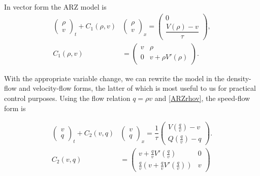 \documentclass[a4paper, 10pt, conference]{ieeeconf}      %
\begin{document}
In vector form the ARZ model is
\begin{subequations} \label{ARZrhov}
\begin{align}
\begin{pmatrix}
	\rho \\
	v
\end{pmatrix}_t
+ 
C_1 \left(\rho, v \right)
&
\begin{pmatrix}
	\rho \\ 
	v
\end{pmatrix}_x = 
\begin{pmatrix}
	0 \\ 
	\dfrac{V(\rho) - v}{\tau}
\end{pmatrix},\\
C_1 \left( \rho, v \right) 
&=
\begin{pmatrix}
	v & \rho \\
	0 & v + \rho V' (\rho)
\end{pmatrix}.
\end{align}
\end{subequations}

With the appropriate variable change, we can rewrite the model in the density-flow and velocity-flow forms, the latter of which is most useful to us for practical control purposes. Using the flow relation $q = \rho v$ and \eqref{ARZrhov}, the speed-flow form is

\begin{subequations}
\begin{align}
\begin{pmatrix}
	v \\ 
	q
\end{pmatrix}_t
+ C_2\left(v, q\right)&
\begin{pmatrix}
	v \\ 
	q
\end{pmatrix}_x 
=
\dfrac{1}{\tau}
\begin{pmatrix}
	V\left( \frac{q}{v}\right) - v \\
	Q\left( \frac{q}{v}\right) - q
\end{pmatrix}. \label{ARZvq} \\
C_2 \left(v, q \right)
&=
\begin{pmatrix}
	v + \frac{q}{v} V'\left( \frac{q}{v} \right) & 0 \\
	\frac{q}{v} \left( v + \frac{q}{v} V'\left( \frac{q}{v} \right) \right) & v
\end{pmatrix}
\end{align}
\end{subequations}
\end{document}
